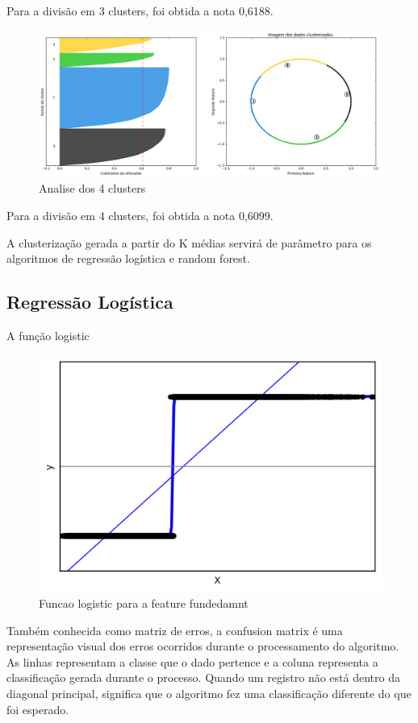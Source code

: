 Para a divisão em 3 clusters, foi obtida a nota 0,6188.


\begin{figure}[!ht]
\caption{Analise dos 4 clusters }
\centerline{\includegraphics[width=.85\textwidth]{img/silhoute4}}
\end{figure}

Para a divisão em 4 clusters, foi obtida a nota 0,6099.


A clusterização gerada a partir do K médias servirá de parâmetro para os algoritmos de regressão logística e random forest.


\subsection{Regressão Logística}

A função logistic

\begin{figure}[!ht]
\caption{Funcao logistic para a feature fundedamnt}
\centerline{\includegraphics[width=.6\textwidth]{img/logit}}
\end{figure}

Também conhecida como matriz de erros, a confusion matrix é uma representação visual dos erros ocorridos durante o processamento do algoritmo. As linhas representam a classe que o dado pertence e a coluna representa a classificação gerada durante o processo. Quando um registro não está dentro da diagonal principal, significa que o algoritmo fez uma classificação diferente do que foi esperado.

